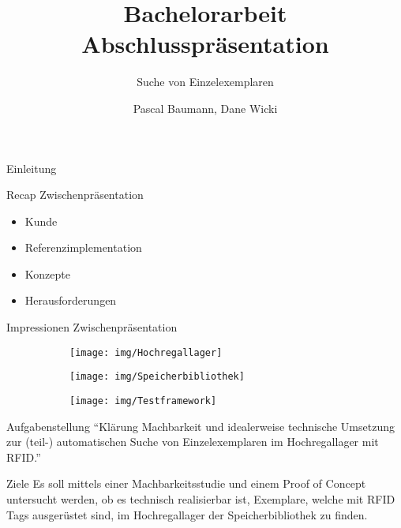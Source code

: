 \documentclass{beamer}
\title{Bachelorarbeit\\ Abschlusspräsentation}
\subtitle{Suche von Einzelexemplaren}
\author{Pascal Baumann, Dane Wicki}
\begin{document}
\begin{frame}[plain]
    \maketitle
\end{frame}
\begin{frame}{Einleitung}
\end{frame}
\begin{frame}{Recap Zwischenpräsentation}
\begin{itemize}
    \item Kunde
    \item Referenzimplementation
    \item Konzepte
    \item Herausforderungen
\end{itemize}
\end{frame}
\begin{frame}{Impressionen Zwischenpräsentation}
\begin{figure}
    \centering
    \begin{subfigure}{0.45\linewidth}
        \texttt{[image: img/Hochregallager]}
    \end{subfigure}
    \begin{subfigure}{0.45\linewidth}
        \texttt{[image: img/Speicherbibliothek]}
    \end{subfigure}
    \vspace{5em}
    \begin{subfigure}{0.7\linewidth}
        \texttt{[image: img/Testframework]}
    \end{subfigure}
\end{figure}
\end{frame}
\begin{frame}{Aufgabenstellung}
\centering
\textquotedblleft Klärung Machbarkeit und idealerweise technische Umsetzung zur (teil-) automatischen Suche von Einzelexemplaren im Hochregallager mit RFID.\textquotedblright
\end{frame}
\begin{frame}{Ziele}
Es soll mittels einer Machbarkeitsstudie und einem Proof of Concept untersucht werden, ob es technisch realisierbar ist, Exemplare, welche mit RFID Tags ausgerüstet sind, im Hochregallager der Speicherbibliothek zu finden.
\end{frame}
\end{document}
